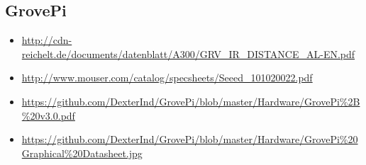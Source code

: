 \documentclass{report}
\begin{document}
\subsection{GrovePi}

\begin{itemize}

\item \url{http://cdn-reichelt.de/documents/datenblatt/A300/GRV_IR_DISTANCE_AL-EN.pdf}

\item \url{http://www.mouser.com/catalog/specsheets/Seeed_101020022.pdf}

\item \url{https://github.com/DexterInd/GrovePi/blob/master/Hardware/GrovePi%2B%20v3.0.pdf}

\item \url{https://github.com/DexterInd/GrovePi/blob/master/Hardware/GrovePi%20Graphical%20Datasheet.jpg}

\end{itemize}
\end{document}
